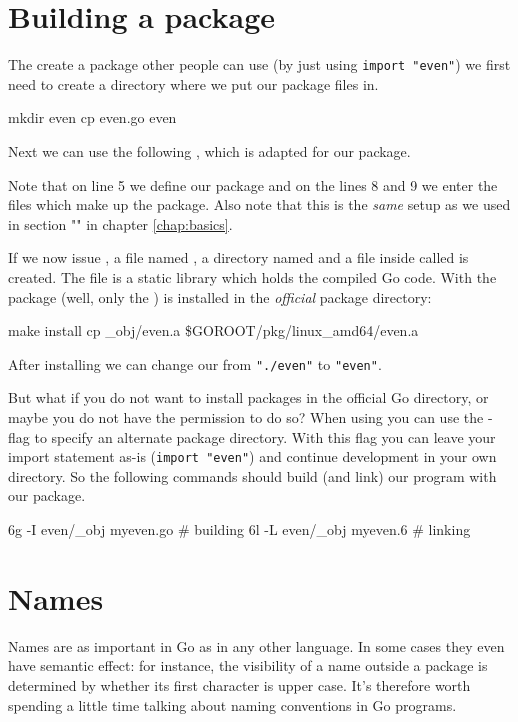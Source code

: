 \section{Building a package}
\label{sec:building a package}
The create a package other people can use (by just using
\lstinline{import "even"}) we first need to create a directory
where we put our package files in. 
\begin{display}
\pr mkdir even
\pr cp even.go even
\end{display}
\noindent{}Next we 
can use the following 
, which 
is adapted for our  package.

Note that on line 5 we define our  package and on the
lines 8 and 9 we enter the files which make up the package.
Also note that this is the \emph{same}  setup as we used
in section "" in chapter
\ref{chap:basics}.

If we now issue , a file named , a directory
named  and a file inside  called  
is created. The file  is a static library which holds
the compiled Go code.
With  the package (well, only the ) is installed in the \emph{official}
package directory:
\begin{display}
\pr make install
cp \_obj/even.a \$GOROOT/pkg/linux\_amd64/even.a
\end{display}
\noindent{}After installing we can change our  from
\lstinline{"./even"} to \lstinline{"even"}.

But what if you do not want to install packages in the official Go
directory, or maybe you do not have the permission to do so? When using
 you can use the -flag to specify an alternate
package directory. With this flag you can leave your import statement
as-is (\lstinline{import "even"}) and continue development in your
own directory. So the following commands should build (and link) our
 program with our package.
\begin{display}
\pr 6g -I even/\_obj myeven.go	# building
\pr 6l -L even/\_obj myeven.6	# linking
\end{display}

\section{Names}
Names are as important in Go as in any other language. In some cases
they even have semantic effect: for instance, the visibility of a name
outside a package is determined by whether its first character is upper
case. It's therefore worth spending a little time talking about naming
conventions in Go programs.

